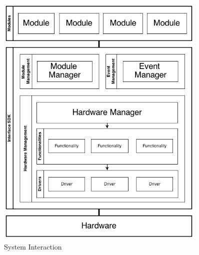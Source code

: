 \documentclass[11pt,letterpaper]{article}
\begin{document}
	\begin{figure}[h!]
		\caption{System Interaction}
		\centering
		\includegraphics[width=0.9\textwidth]{interface_sdk}
	\end{figure}
 
 
\end{document}
